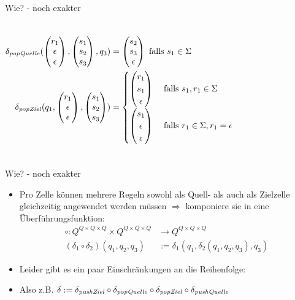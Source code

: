 \documentclass{beamer}
\begin{document}
\begin{frame}[t]{Wie? - noch exakter}
\begin{itemize}
{\begin{columns}
            \column{0cm}
            \begin{align*}
    \delta_{\mathit{popQuelle}}(\begin{pmatrix}r_1\\\epsilon\\\epsilon\end{pmatrix},\begin{pmatrix}s_1\\s_2\\s_3\end{pmatrix},q_3) &= \begin{pmatrix}s_2\\s_3\\\epsilon\end{pmatrix} \text { falls } s_1 \in \Sigma \\
    \delta_{\mathit{popZiel}}(q_1,\begin{pmatrix}r_1\\\epsilon\\\epsilon\end{pmatrix},\begin{pmatrix}s_1\\s_2\\s_3\end{pmatrix}) &= \begin{cases}
        \begin{pmatrix}r_1\\s_1\\\epsilon\end{pmatrix} &\text { falls } s_1,r_1 \in \Sigma \\
        \begin{pmatrix}s_1\\\epsilon\\\epsilon\end{pmatrix} &\text { falls } r_1 \in \Sigma, r_1 = \epsilon
    \end{cases}
\end{align*}
\end{columns}
}
    \end{itemize}
\end{frame}

\begin{frame}{Wie? - noch exakter}
    \begin{itemize}
        \item Pro Zelle können mehrere Regeln sowohl als Quell- als auch als Zielzelle gleichzeitig angewendet werden müssen $\Rightarrow$ komponiere sie in eine Überführungsfunktion:
\begin{align*}
    \circ : Q^{Q \times Q \times Q} \times Q^{Q \times Q \times Q} &\rightarrow Q^{Q \times Q \times Q} \\
    (\delta_1 \circ \delta_2)(q_1,q_2,q_3) &:= \delta_1(q_1,\delta_2(q_1,q_2,q_3),q_3)
\end{align*}
\item Leider gibt es ein paar Einschränkungen an die Reihenfolge:
    \begin{center}
    \end{center}
\item Also z.B.
    $ \delta := \delta_{\mathit{pushZiel}} \circ \delta_{\mathit{popQuelle}} \circ \delta_{\mathit{popZiel}} \circ \delta_{\mathit{pushQuelle}} $
    \end{itemize}
\end{frame}
\end{document}

